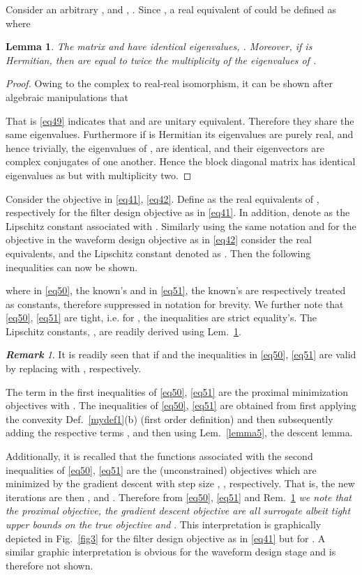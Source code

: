 \documentclass[11pt,draftclsnofoot,onecolumn]{IEEEtran}
\newtheorem{lem}{\bf {Lemma}}
\theoremstyle{definition}
\theoremstyle{remark}
\newtheorem{remk}{\bf Remark}
\begin{document}
Consider an arbitrary , and , . Since , a real equivalent of  could be defined as  where 


\begin{lem}\label{lemma6}
The matrix  and  have identical eigenvalues, .  Moreover, if  is Hermitian, then  are equal to twice the multiplicity of the eigenvalues of  .
\end{lem}
\begin{proof} 
Owing to the complex to real-real isomorphism, it can be shown after algebraic manipulations that

That is \eqref{eq49} indicates that  and  are unitary equivalent. Therefore they share the same eigenvalues. Furthermore if  is Hermitian its eigenvalues are purely real, and  hence trivially,  the eigenvalues of ,  are identical, and their eigenvectors are complex conjugates of one another. Hence the block diagonal matrix has identical eigenvalues as  but with multiplicity two.
\end{proof}

Consider the objective in \eqref{eq41}, \eqref{eq42}. Define  as the real equivalents of , respectively for the filter design objective as in \eqref{eq41}. In addition, denote   as the Lipschitz constant associated with . Similarly using the same notation and for the objective in the waveform design objective  as in \eqref{eq42} consider the real equivalents,  and the Lipschitz constant denoted as . Then the following inequalities can now be shown.


where in \eqref{eq50}, the known's  and  in \eqref{eq51}, the known's  are respectively treated as constants, therefore suppressed in notation  for brevity. We further note that \eqref{eq50}, \eqref{eq51} are tight, i.e.  for ,   the inequalities are strict equality's. The Lipschitz constants, ,  are readily derived using Lem.~\ref{lemma6}.  
\begin{remk} \label{remark4}
It is readily seen that if  and  the inequalities in \eqref{eq50}, \eqref{eq51} are valid by replacing  with , respectively.
\end{remk}

The term in the first inequalities of \eqref{eq50}, \eqref{eq51} are the proximal minimization objectives with . The  inequalities of \eqref{eq50}, \eqref{eq51}  are obtained from first applying the convexity Def.~\ref{mydef1}(b) (first order definition) and then subsequently adding the respective terms ,  and then using  Lem.~\ref{lemma5}, the descent lemma. 

Additionally, it is recalled that the functions associated with the second  inequalities of \eqref{eq50}, \eqref{eq51} are the  (unconstrained) objectives which are minimized by the gradient descent with step size , , respectively. That is, the new iterations are then , and  . Therefore from \eqref{eq50}, \eqref{eq51} and Rem.~\ref{remark4} {\it we note that the proximal objective, the gradient descent objective are all surrogate albeit tight upper bounds on the true objective  and }. This interpretation is graphically depicted in Fig.~\ref{fig3} for the filter design objective as in \eqref{eq41} but for . A similar graphic interpretation is obvious for the waveform design stage and is therefore not shown.
\end{document}
